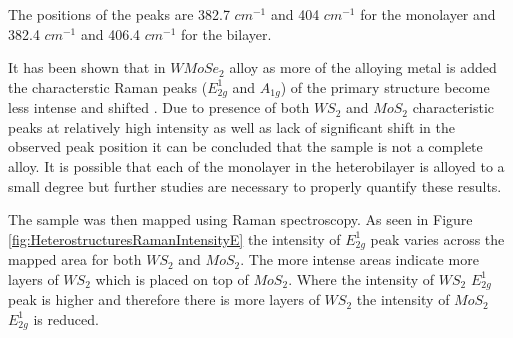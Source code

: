 The positions of the peaks are 382.7 $cm^{-1}$ and 404 $cm^{-1}$ for the monolayer and 382.4 $cm^{-1}$ and 406.4 $cm^{-1}$ for the bilayer. 

It has been shown that in $WMoSe_2$ alloy as more of the alloying metal is added the characterstic Raman peaks ($E^1_{2g}$ and $A_{1g}$) of the primary structure become less intense and shifted \cite{Zhang2014}. Due to presence of both $WS_2$ and $MoS_2$ characteristic peaks at relatively high intensity as well as lack of significant shift in the observed peak position it can be concluded that the sample is not a complete alloy. It is possible that each of the monolayer in the heterobilayer is alloyed to a small degree but further studies are necessary to properly quantify these results.

The sample was then mapped using Raman spectroscopy. As seen in Figure \ref{fig:HeterostructuresRamanIntensityE} the intensity of $E^1_{2g}$ peak varies across the mapped area for both $WS_2$ and $MoS_2$. The more intense areas indicate more layers of $WS_2$ which is placed on top of $MoS_2$. Where the intensity of $WS_2$ $E^1_{2g}$ peak is higher and therefore there is more layers of $WS_2$ the intensity of $MoS_2$ $E^1_{2g}$ is reduced. 

